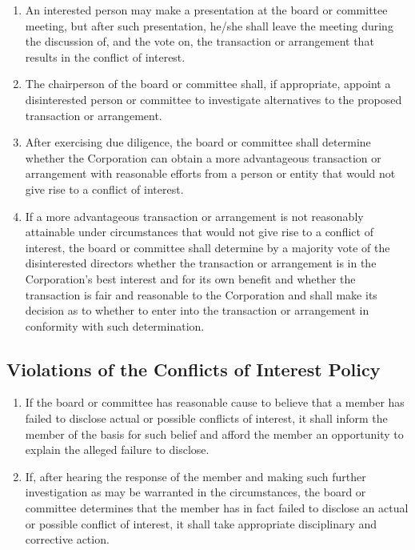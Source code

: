 \documentclass[12pt]{article}
\begin{document}
\begin{enumerate}
\item An interested person may make a presentation at the board or committee meeting, but after such presentation, he/she shall leave the meeting during the discussion of, and the vote on, the transaction or arrangement that results in the conflict of interest. 

\item The chairperson of the board or committee shall, if appropriate, appoint a disinterested person or committee to investigate alternatives to the proposed transaction or arrangement. 

\item After exercising due diligence, the board or committee shall determine whether the Corporation can obtain a more advantageous transaction or arrangement with reasonable efforts from a person or entity that would not give rise to a conflict of interest. 

\item If a more advantageous transaction or arrangement is not reasonably attainable under circumstances that would not give rise to a conflict of interest, the board or committee shall determine by a majority vote of the disinterested directors whether the transaction or arrangement is in the Corporation's best interest and for its own benefit and whether the transaction is fair and reasonable to the Corporation and shall make its decision as to whether to enter into the transaction or arrangement in conformity with such determination. 
\end{enumerate}

\subsection{Violations of the Conflicts of Interest Policy}

\begin{enumerate}
\item If the board or committee has reasonable cause to believe that a member has failed to disclose actual or possible conflicts of interest, it shall inform the member of the basis for such belief and afford the member an opportunity to explain the alleged failure to disclose. 

\item If, after hearing the response of the member and making such further investigation as may be warranted in the circumstances, the board or committee determines that the member has in fact failed to disclose an actual or possible conflict of interest, it shall take appropriate disciplinary and corrective action. 
\end{enumerate}
\end{document}
